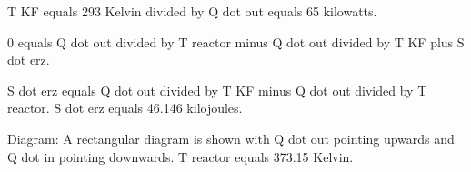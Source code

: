 T KF equals 293 Kelvin divided by Q dot out equals 65 kilowatts.  

0 equals Q dot out divided by T reactor minus Q dot out divided by T KF plus S dot erz.  

S dot erz equals Q dot out divided by T KF minus Q dot out divided by T reactor.  
S dot erz equals 46.146 kilojoules.  

Diagram:  
A rectangular diagram is shown with Q dot out pointing upwards and Q dot in pointing downwards.  
T reactor equals 373.15 Kelvin.